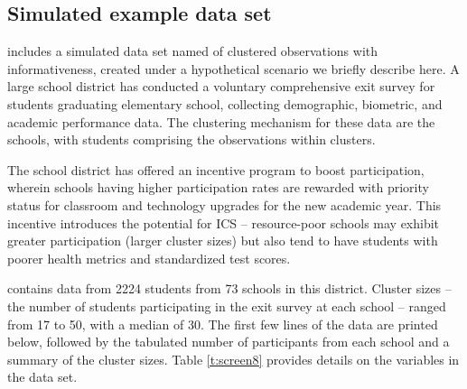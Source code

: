 \subsection[Data Set]{Simulated example data set} \label{ss:dataset}

 includes a simulated data set named  of clustered observations with informativeness, created under a hypothetical scenario we briefly describe here. A large school district has conducted a voluntary comprehensive exit survey for students graduating elementary school, collecting demographic, biometric, and academic performance data. The clustering mechanism for these data are the schools, with students comprising the observations within clusters.

The school district has offered an incentive program to boost participation, wherein schools having higher participation rates are rewarded with priority status for classroom and technology upgrades for the new academic year. This incentive introduces the potential for ICS -- resource-poor schools may exhibit greater participation (larger cluster sizes) but also tend to have students with poorer health metrics and standardized test scores. 

 contains data from 2224 students from 73 schools in this district. Cluster sizes -- the number of students participating in the exit survey at each school -- ranged from 17 to 50, with a median of 30. The first few lines of the data are printed below, followed by the tabulated number of participants from each school and a summary of the cluster sizes. Table \ref{t:screen8} provides details on the variables in the data set. 


